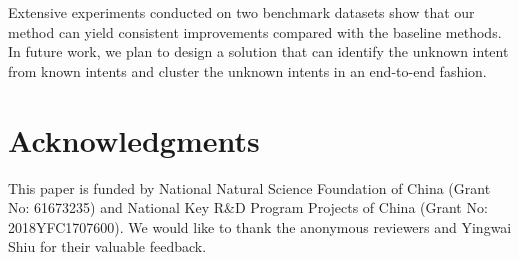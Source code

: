 \documentclass[11pt,a4paper]{article}
\begin{document}
Extensive experiments conducted on two benchmark datasets show that our method can yield consistent improvements compared with the baseline methods.  In future work, we plan to design a solution that can identify the unknown intent from known intents and cluster the unknown intents in an end-to-end fashion.

\section*{Acknowledgments}
This paper is funded by National Natural Science Foundation of China (Grant No: 61673235) and National Key R\&D Program Projects of China (Grant No: 2018YFC1707600). We would like to thank the anonymous reviewers and Yingwai Shiu for their valuable feedback. 


\end{document}
